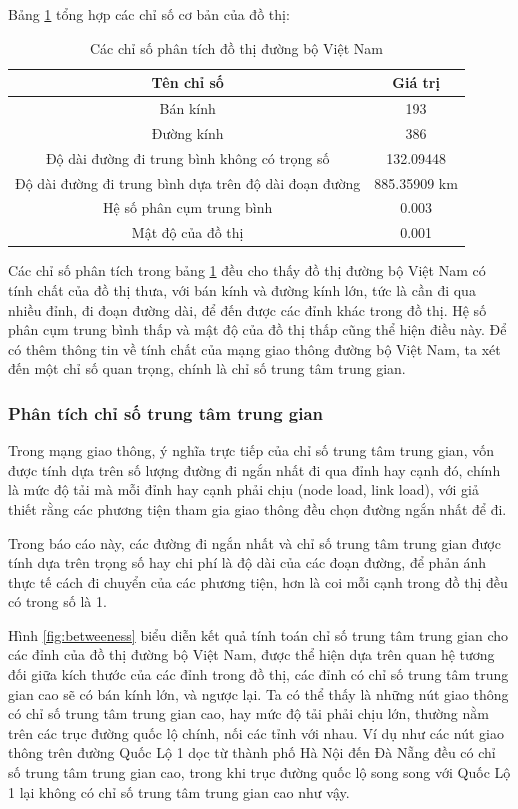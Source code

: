 \documentclass[14pt, oneside, a4paper, openany]{scrartcl}
\begin{document}
Bảng \ref{table:measures} tổng hợp các chỉ số cơ bản của đồ thị:
\begin{table}[!h]
	\caption[Các chỉ số phân tích đồ thị đường bộ Việt Nam]{Các chỉ số phân tích đồ thị đường bộ Việt Nam}
	\centering
	\begin{tabular}{ |c|c| } 
		\hline
		Tên chỉ số & Giá trị \\ 
		\hline
		Bán kính & 193\\
		Đường kính & 386\\ 
		Độ dài đường đi trung bình không có trọng số & 132.09448\\
		Độ dài đường đi trung bình dựa trên độ dài đoạn đường & 885.35909 km\\ 
		Hệ số phân cụm trung bình & 0.003\\
		Mật độ của đồ thị & 0.001\\ 
		\hline
	\end{tabular}
	\label{table:measures}
\end{table}

Các chỉ số phân tích trong bảng \ref{table:measures} đều cho thấy đồ thị đường bộ Việt Nam có tính chất của đồ thị thưa, với bán kính và đường kính lớn, tức là cần đi qua nhiều đỉnh, đi đoạn đường dài, để đến được các đỉnh khác trong đồ thị. Hệ số phân cụm trung bình thấp và mật độ của đồ thị thấp cũng thể hiện điều này.
Để có thêm thông tin về tính chất của mạng giao thông đường bộ Việt Nam, ta xét đến một chỉ số quan trọng, chính là chỉ số trung tâm trung gian.

\subsubsection{Phân tích chỉ số trung tâm trung gian}
Trong mạng giao thông, ý nghĩa trực tiếp của chỉ số trung tâm trung gian, vốn được tính dựa trên số lượng đường đi ngắn nhất đi qua đỉnh hay cạnh đó, chính là mức độ tải mà mỗi đỉnh hay cạnh phải chịu (node load, link load), với giả thiết rằng các phương tiện tham gia giao thông đều chọn đường ngắn nhất để đi.

Trong báo cáo này, các đường đi ngắn nhất và chỉ số trung tâm trung gian được tính dựa trên trọng số hay chi phí là độ dài của các đoạn đường, để phản ánh thực tế cách đi chuyển của các phương tiện, hơn là coi mỗi cạnh trong đồ thị đều có trong số là 1.

Hình \ref{fig:betweeness} biểu diễn kết quả tính toán chỉ số trung tâm trung gian cho các đỉnh của đồ thị đường bộ Việt Nam, được thể hiện dựa trên quan hệ tương đối giữa kích thước của các đỉnh trong đồ thị, các đỉnh có chỉ số trung tâm trung gian cao sẽ có bán kính lớn, và ngược lại.
Ta có thể thấy là những nút giao thông có chỉ số trung tâm trung gian cao, hay mức độ tải phải chịu lớn, thường nằm trên các trục đường quốc lộ chính, nối các tỉnh với nhau. Ví dụ như các nút giao thông trên đường Quốc Lộ 1 dọc từ thành phố Hà Nội đến Đà Nẵng đều có chỉ số trung tâm trung gian cao, trong khi trục đường quốc lộ song song với Quốc Lộ 1 lại không có chỉ số trung tâm trung gian cao như vậy.
\end{document}
